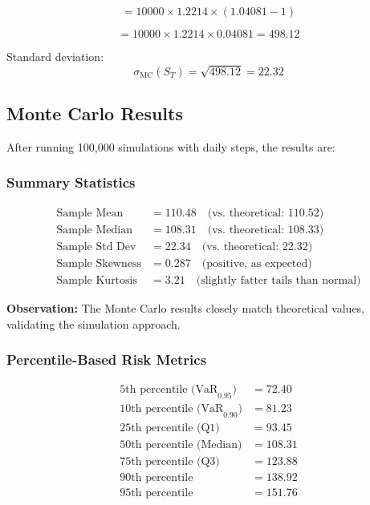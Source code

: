 \documentclass[12pt,a4paper]{article}
\begin{document}
\begin{equation}
= 10000 \times 1.2214 \times (1.04081 - 1)
\end{equation}

\begin{equation}
= 10000 \times 1.2214 \times 0.04081 = 498.12
\end{equation}

Standard deviation:
\begin{equation}
\sigma_{\text{MC}}(S_T) = \sqrt{498.12} = 22.32
\end{equation}

\subsection{Monte Carlo Results}

After running 100,000 simulations with daily steps, the results are:

\subsubsection{Summary Statistics}

\begin{align}
\text{Sample Mean} &= 110.48 \quad \text{(vs. theoretical: 110.52)} \\
\text{Sample Median} &= 108.31 \quad \text{(vs. theoretical: 108.33)} \\
\text{Sample Std Dev} &= 22.34 \quad \text{(vs. theoretical: 22.32)} \\
\text{Sample Skewness} &= 0.287 \quad \text{(positive, as expected)} \\
\text{Sample Kurtosis} &= 3.21 \quad \text{(slightly fatter tails than normal)}
\end{align}

\textbf{Observation:} The Monte Carlo results closely match theoretical values, validating the simulation approach.

\subsubsection{Percentile-Based Risk Metrics}

\begin{align}
\text{5th percentile (VaR}_{0.95}) &= 72.40 \\
\text{10th percentile (VaR}_{0.90}) &= 81.23 \\
\text{25th percentile (Q1)} &= 93.45 \\
\text{50th percentile (Median)} &= 108.31 \\
\text{75th percentile (Q3)} &= 123.88 \\
\text{90th percentile} &= 138.92 \\
\text{95th percentile} &= 151.76 \\
\end{align}
\end{document}

